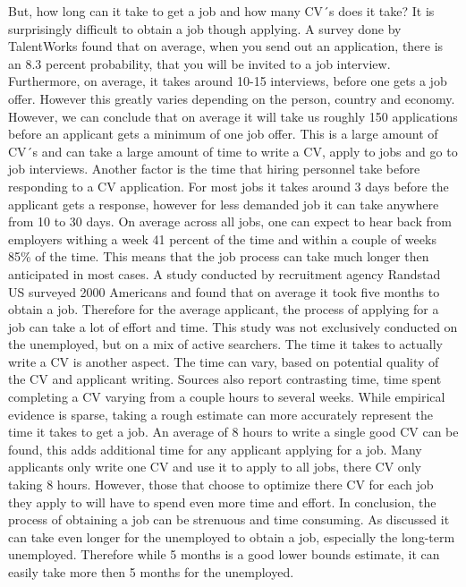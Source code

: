 But, how long can it take to get a job and how many CV´s does it take?
It is surprisingly difficult to obtain a job though applying.
A survey done by TalentWorks found that on average, when you send out an application, there is an 8.3 percent probability, that you will be invited to a job interview. 
Furthermore, on average, it takes around 10-15 interviews, before one gets a job offer. 
However this greatly varies depending on the person, country and economy.
However, we can conclude that on average it will take us roughly 150 applications before an applicant gets a minimum of one job offer.\cite{HR-sales}
This is a large amount of CV´s and can take a large amount of time to write a CV, apply to jobs and go to job interviews.
Another factor is the time that hiring personnel take before responding to a CV application.
For most jobs it takes around 3 days before the applicant gets a response, however for less demanded job it can take anywhere from 10 to 30 days.\cite{HR-sales}
On average across all jobs, one can expect to hear back from employers withing a week 41 percent of the time and within a couple of weeks 85\% of the time.
This means that the job process can take much longer then anticipated in most cases.
A study conducted by recruitment agency Randstad US surveyed 2000 Americans and found that on average it took five months to obtain a job.\cite{5_month_for_a_job}
Therefore for the average applicant, the process of applying for a job can take a lot of effort and time.
This study was not exclusively conducted on the unemployed, but on a mix of active searchers.
The time it takes to actually write a CV is another aspect.
The time can vary, based on potential quality of the CV and applicant writing.
Sources also report contrasting time, time spent completing a CV varying from a couple hours to several weeks.
While empirical evidence is sparse, taking a rough estimate can more accurately represent the time it takes to get a job.
An average of 8 hours to write a single good CV can be found, this adds additional time for any applicant applying for a job.
Many applicants only write one CV and use it to apply to all jobs, there CV only taking 8 hours. %
However, those that choose to optimize there CV for each job they apply to will have to spend even more time and effort. 
In conclusion, the process of obtaining a job can be strenuous and time consuming.\cite{Time_spent_writing_CV}
As discussed it can take even longer for the unemployed to obtain a job, especially the long-term unemployed.
Therefore while 5 months is a good lower bounds estimate, it can easily take more then 5 months for the unemployed. \\

